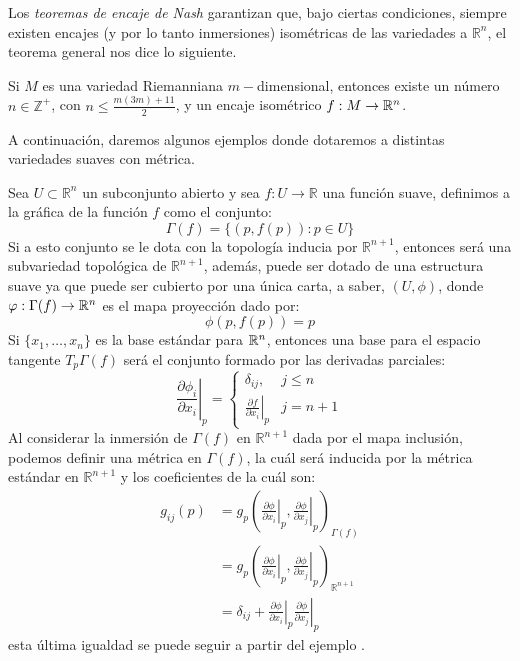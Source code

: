Los \textit{teoremas de encaje de Nash} garantizan que, bajo ciertas condiciones, siempre existen encajes (y por lo tanto inmersiones) isométricas de las variedades a $\mathbb{R}^{n}$, el teorema general nos dice lo siguiente.

\begin{theorem}
	Si $M$ es una variedad Riemanniana $m-$dimensional, entonces existe un número $n \in \mathbb{Z}^{+}$, con $n \leq \frac{m(3m)+11}{2}$, y un encaje isométrico $f: M \to \mathbb{R}^{n}$.
\end{theorem}

A continuación, daremos algunos ejemplos donde dotaremos a distintas variedades suaves con métrica.

\begin{example}\label{Ejemplo: Métrica - Gráfica de funciones suaves}
	Sea $U \subset \mathbb{R}^{n}$ un subconjunto abierto y sea $f: U \to \mathbb{R}$ una función suave, definimos a la gráfica de la función $f$ como el conjunto:
	\[
		\Gamma(f) = \{(p,f(p)): p \in U\}
	\]
	Si a esto conjunto se le dota con la topología inducia por $\mathbb{R}^{n+1}$, entonces será una subvariedad topológica de $\mathbb{R}^{n+1}$, además, puede ser dotado de una estructura suave ya que puede ser cubierto por una única carta, a saber, $(U,\phi)$,  donde $\varphi: \Gamma(f) \to \mathbb{R}^{n}$ es el mapa proyección dado por:
	\[
		\phi(p,f(p)) = p
	\]
	Si $\{x_{1},\ldots,x_{n}\}$ es la base estándar para $\mathbb{R}^{n}$, entonces una base para el espacio tangente $T_{p}\Gamma(f)$ será el conjunto formado por las derivadas parciales:
	\[
		\left. \frac{\partial \phi_i}{\partial x_i} \right|_{p} =
		\begin{cases}
			\delta_{ij},                                     & j \leq n \\
			\left. \frac{\partial f}{\partial x_i} \right|_p & j=n+1
		\end{cases}
	\]
	Al considerar la inmersión de $\Gamma(f)$ en $\mathbb{R}^{n+1}$ dada por el mapa inclusión, podemos definir una métrica en $\Gamma(f)$, la cuál será inducida por la métrica estándar en $\mathbb{R}^{n+1}$ y los coeficientes de la cuál son:
	\begin{align*}
		g_{ij}(p) & = g_{p} \left(
		\left. \frac{\partial \phi}{\partial x_{i}}\right|_{p},
		\left. \frac{\partial \phi}{\partial x_{j}}\right|_{p}
		\right)_{\Gamma(f)}         \\
		          & = g_{p} \left(
		\left. \frac{\partial \phi}{\partial x_{i}}\right|_{p},
		\left. \frac{\partial \phi}{\partial x_{j}}\right|_{p}
		\right)_{\mathbb{R}^{n+1}}  \\
		          & = \delta_{ij} +
		\left. \frac{\partial \phi}{\partial x_{i}}\right|_{p}
		\left. \frac{\partial \phi}{\partial x_{j}}\right|_{p}
	\end{align*}
	esta última igualdad se puede seguir a partir del ejemplo \label{Ejemplo: Métrica - Producto de Variedades}.
\end{example}



